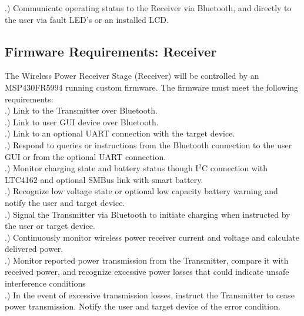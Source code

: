 \documentclass[12pt]{article}
\begin{document}
.) Communicate operating status to the Receiver via Bluetooth, and directly to the user via fault LED’s or an installed LCD.


\subsection{Firmware Requirements: Receiver}

\indent \indent
The Wireless Power Receiver Stage (Receiver) will be controlled by an MSP430FR5994 running custom firmware. The firmware must meet the following requirements:\\

.) Link to the Transmitter over Bluetooth.\\

.) Link to user GUI device over Bluetooth.\\

.) Link to an optional UART connection with the target device.\\

.) Respond to queries or instructions from the Bluetooth connection to the user GUI or from the optional UART connection.\\

.) Monitor charging state and battery status though I$^2$C connection with LTC4162 and optional SMBus link with smart battery.\\

.) Recognize low voltage state or optional low capacity battery warning and notify the user and target device.\\

.) Signal the Transmitter via Bluetooth to initiate charging when instructed by the user or target device.\\

.) Continuously monitor wireless power receiver current and voltage and calculate delivered power.\\

.) Monitor reported power transmission from the Transmitter, compare it with received power, and recognize excessive power losses that could indicate unsafe interference conditions\\

.) In the event of excessive transmission losses, instruct the Transmitter to cease power transmission. Notify the user and target device of the error condition.\\
\end{document}
